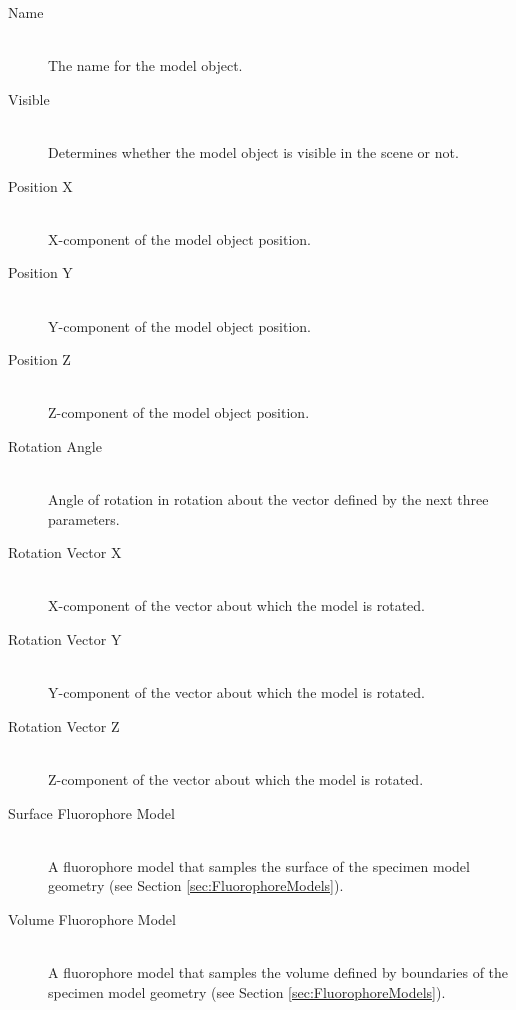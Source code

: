 \documentclass[11pt,titlepage,twoside]{article}
\begin{document}
\begin{description}

  \item[Name] \hfill \\
  The name for the model object.
  
  \item[Visible] \hfill \\
  Determines whether the model object is visible in the scene or not.


  \item[Position X] \hfill \\
   X-component of the model object position.

  \item[Position Y] \hfill \\
  Y-component of the model object position.

  \item[Position Z] \hfill \\
  Z-component of the model object position.
  
  \item[Rotation Angle] \hfill \\
  Angle of rotation in rotation about the vector defined by the next three parameters.
  
  \item[Rotation Vector X] \hfill \\
  X-component of the vector about which the model is rotated.
  
  \item[Rotation Vector Y] \hfill \\
  Y-component of the vector about which the model is rotated.
  
  \item[Rotation Vector Z] \hfill \\
  Z-component of the vector about which the model is rotated.
  
  \item[Surface Fluorophore Model] \hfill \\
  A fluorophore model that samples the surface of the specimen model geometry (see Section \ref{sec:FluorophoreModels}).
  
  \item[Volume Fluorophore Model] \hfill \\
  A fluorophore model that samples the volume defined by boundaries of the specimen model geometry (see Section \ref{sec:FluorophoreModels}).

\end{description}
\end{document}

